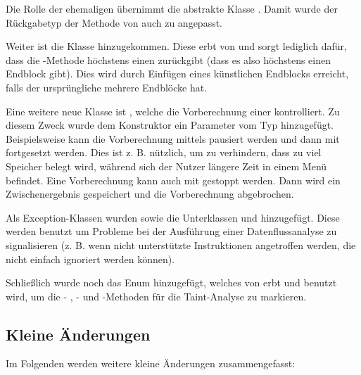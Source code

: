 Die Rolle der ehemaligen  übernimmt die abstrakte Klasse .
Damit wurde der Rückgabetyp der Methode  von  auch zu  angepasst.

Weiter ist die Klasse  hinzugekommen.
Diese erbt von  und sorgt lediglich dafür, dass die -Methode höchstens einen  zurückgibt (dass es also höchstens einen Endblock gibt). Dies wird durch Einfügen eines künstlichen Endblocks erreicht, falls der ursprüngliche  mehrere Endblöcke hat.

Eine weitere neue Klasse ist , welche die Vorberechnung einer  kontrolliert. Zu diesem Zweck wurde dem Konstruktor ein Parameter vom Typ  hinzugefügt.
Beispielsweise kann die Vorberechnung mittels  pausiert werden und dann mit  fortgesetzt werden. 
Dies ist z. B. nützlich, um zu verhindern, dass zu viel Speicher belegt wird, während sich der Nutzer längere Zeit in einem Menü befindet. 
Eine Vorberechnung kann auch mit  gestoppt werden.
Dann wird ein Zwischenergebnis gespeichert und die Vorberechnung abgebrochen.

Als Exception-Klassen wurden  sowie die Unterklassen  und  hinzugefügt.
Diese werden benutzt um Probleme bei der Ausführung einer Datenflussanalyse zu signalisieren (z. B. wenn nicht unterstützte Instruktionen angetroffen werden, die nicht einfach ignoriert werden können).

Schließlich wurde noch das Enum  hinzugefügt, welches von  erbt und benutzt wird, um die - , - und -Methoden für die Taint-Analyse zu markieren.

\subsection{Kleine Änderungen}

Im Folgenden werden weitere kleine Änderungen zusammengefasst:

